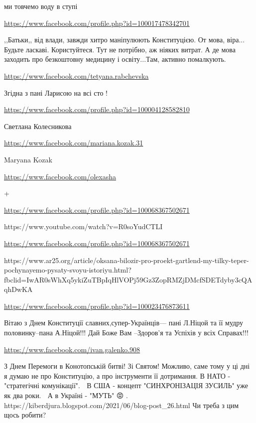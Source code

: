 \documentclass[a4paper,11pt]{extreport}
\begin{document}
\begin{itemize}
ми товчемо воду в ступі

\url{https://www.facebook.com/profile.php?id=100017478342701}

,,Батьки,, від влади, завжди хитро маніпулюють Конституцією.
От мова, віра...
Будьте ласкаві.
Користуйтеся.
Тут не потрібно, аж ніяких витрат.
А де мова заходить про безкоштовну медицину і освіту...Там, активно помалкують.

\url{https://www.facebook.com/tetyana.rabchevska}

Згідна з пані Ларисою на всі сто !

\url{https://www.facebook.com/profile.php?id=100004128582810}

Светлана Колесникова

\url{https://www.facebook.com/mariana.kozak.31}

Maryana Kozak

\url{https://www.facebook.com/olexasha}

+

\url{https://www.facebook.com/profile.php?id=100068367502671}

https://www.youtube.com/watch?v=R0soYudCTLI

\url{https://www.facebook.com/profile.php?id=100068367502671}

https://www.ar25.org/article/oksana-bilozir-pro-proekt-gartlend-my-tilky-teper-pochynayemo-pysaty-svoyu-istoriyu.html?fbclid=IwAR0sWhXq5ykiZuTBpIqHlVOPj59Gz3ZopRMZjDMcfSDETdyby3cQAqhDwKA

\url{https://www.facebook.com/profile.php?id=100023476873611}

Вітаю з Днем Конституції славних,супер-Українців--- пані Л.Ніцой та її мудру половинку--пана А.Ніцой!!! Дай Боже Вам --Здоров'я та Успіхів у всіх Справах!!!

\url{https://www.facebook.com/ivan.galenko.908}

З Днем Перемоги в Конотопській битві! Зі Святом!
Можливо, саме тому у ці дні я думаю не про Конституцію, а про інструменти її дотримання. В НАТО - "стратегічні комунікації". 👫 В США - концепт "СИНХРОНІЗАЦІЯ ЗУСИЛЬ" уже як два роки. 🚀 А в Україні - "МУТЬ" 😡 . https://kiberdjura.blogspot.com/2021/06/blog-post_26.html Чи треба з цим щось робити? 🤫

\end{itemize}
\end{document}
